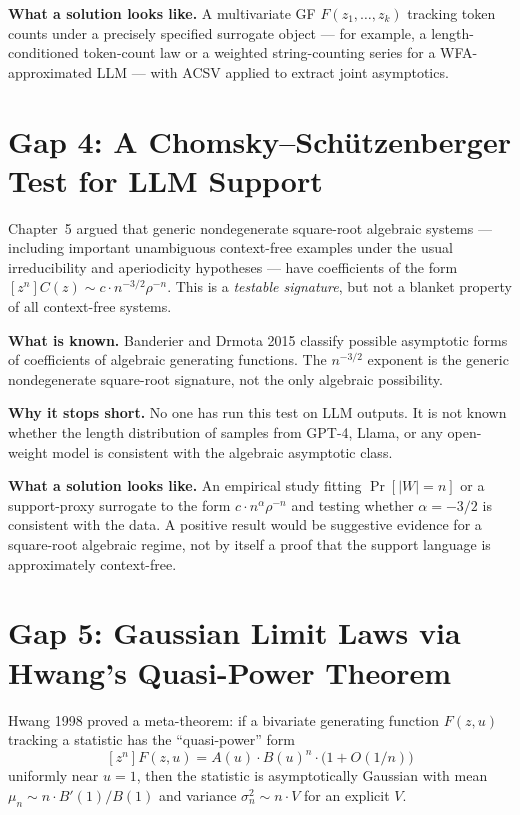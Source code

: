 \textbf{What a solution looks like.} A multivariate GF $F(z_1,\ldots,z_k)$ tracking token counts under a precisely specified surrogate object --- for example, a length-conditioned token-count law or a weighted string-counting series for a WFA-approximated LLM --- with ACSV applied to extract joint asymptotics.

\section{Gap 4: A Chomsky--Sch\"utzenberger Test for LLM Support}
\label{ch18:gap4}

Chapter~5 argued that generic nondegenerate square-root algebraic systems --- including important unambiguous context-free examples under the usual irreducibility and aperiodicity hypotheses --- have coefficients of the form $[z^n]C(z)\sim c\cdot n^{-3/2}\rho^{-n}$. This is a \emph{testable signature}, but not a blanket property of all context-free systems.

\textbf{What is known.} Banderier and Drmota 2015 \cite{BanderierDrmota2015} classify possible asymptotic forms of coefficients of algebraic generating functions. The $n^{-3/2}$ exponent is the generic nondegenerate square-root signature, not the only algebraic possibility.

\textbf{Why it stops short.} No one has run this test on LLM outputs. It is not known whether the length distribution of samples from GPT-4, Llama, or any open-weight model is consistent with the algebraic asymptotic class.

\textbf{What a solution looks like.} An empirical study fitting $\Pr[|W|=n]$ or a support-proxy surrogate to the form $c\cdot n^{\alpha}\rho^{-n}$ and testing whether $\alpha=-3/2$ is consistent with the data. A positive result would be suggestive evidence for a square-root algebraic regime, not by itself a proof that the support language is approximately context-free.

\section{Gap 5: Gaussian Limit Laws via Hwang's Quasi-Power Theorem}
\label{ch18:gap5}

Hwang 1998 \cite{Hwang1998} proved a meta-theorem: if a bivariate generating function $F(z,u)$ tracking a statistic has the ``quasi-power'' form
$$
[z^n]F(z,u)=A(u)\cdot B(u)^n\cdot\bigl(1+O(1/n)\bigr)
$$
uniformly near $u=1$, then the statistic is asymptotically Gaussian with mean $\mu_n\sim n\cdot B'(1)/B(1)$ and variance $\sigma_n^2\sim n\cdot V$ for an explicit $V$.

